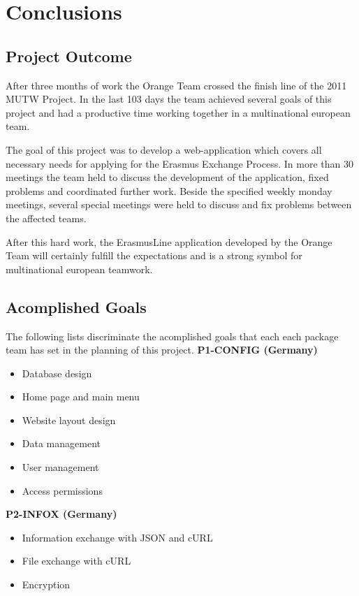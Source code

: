 \chapter{Conclusions}
\section{Project Outcome}
After three months of work the Orange Team crossed the finish
line of the 2011 MUTW Project. In the last 103 days the team achieved several goals of this
project and had a productive time working together in a multinational european
team.

The goal of this project was to develop a web-application which covers
all necessary needs for applying for the Erasmus Exchange Process. In more than
30 meetings the team held to discuss the development of the application, fixed
problems and coordinated further work. Beside the specified weekly monday
meetings, several special meetings were held to discuss and fix problems between
the affected teams.

After this hard work, the ErasmusLine application developed
by the Orange Team will certainly fulfill the expectations and is a strong
symbol for multinational european teamwork.

\section{Acomplished Goals}
The following lists discriminate the acomplished goals that each each package
team has set in the planning of this project.
\newline \newline
\indent \textbf{P1-CONFIG (Germany)}
\begin{itemize}
  \item Database design
  \item Home page and main menu
  \item Website layout design
  \item Data management
  \item User management
  \item Access permissions
\end{itemize}


\textbf{P2-INFOX (Germany)}
\begin{itemize}
  \item Information exchange with JSON and cURL
  \item File exchange with cURL
  \item Encryption
\end{itemize}


